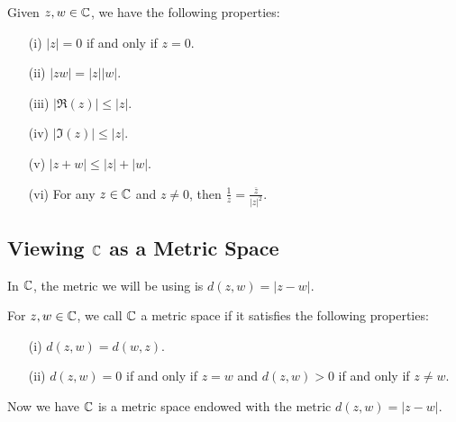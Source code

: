 \documentclass[a4paper]{report}
\begin{document}
\begin{prop}
   Given \( z,w \in \mathbb{C}  \), we have the following properties:
   \begin{enumerate}
       \item[(i)] \( | z  |  = 0  \) if and only if \( z = 0  \).
        \item[(ii)] \( | zw  |  = | z  | | w |  \).
        \item[(iii)] \( | \Re(z) |  \leq | z  |  \).
        \item[(iv)] \( | \Im(z) | \leq | z |  \).
        \item[(v)] \( | z + w  | \leq | z  |  + | w |  \).
        \item[(vi)] For any \( z \in \mathbb{C}  \) and \( z \neq 0  \), then
            \(  \frac{ 1 }{ z }  = \frac{ \overline{z} }{ | z |^{2} }. \)
   \end{enumerate}
\end{prop}

\subsection{Viewing \( \mathbb{C}  \) as a Metric Space}

In \( \mathbb{C}  \), the metric we will be using is \( d(z,w) =  | z - w  |  \).

\begin{definition}
   For \( z,w \in \mathbb{C}  \), we call \( \mathbb{C}  \) a metric space if it satisfies the following properties: 
   \begin{enumerate}
       \item[(i)] \( d(z,w) = d(w,z) \).
        \item[(ii)] \( d(z,w) = 0  \) if and only if \( z = w  \) and \( d(z,w) > 0  \) if and only if \( z \neq w  \).
   \end{enumerate}
\end{definition}

Now we have \( \mathbb{C}  \) is a metric space endowed with the metric \( d(z,w) = | z - w  |  \).
\end{document}
